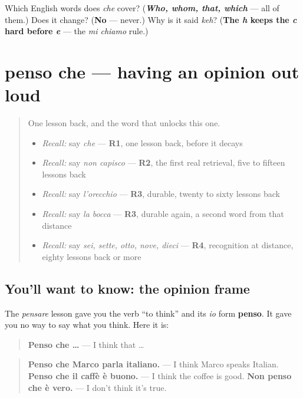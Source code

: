 \begin{tcolorbox}[breakable,colback=teal!4,colframe=teal!35!black,title={Before you move on}]
Which English words does \emph{che} cover? (\emph{\textbf{Who, whom, that, which}} — all of them.) Does it change? (\textbf{No} — never.) Why is it said \emph{keh}? (\textbf{The \emph{h} keeps the \emph{c} hard before \emph{e}} — the \emph{mi chiamo} rule.)
\end{tcolorbox}
\section[penso che]{penso che — having an opinion out loud}

\label{lesson:IT-C31-penso-che}



\begin{quote}
One lesson back, and the word that unlocks this one.

\begin{itemize}
\raggedright
  \item \emph{Recall:} say \emph{che} — \textbf{R1}, one lesson back, before it decays
  \item \emph{Recall:} say \emph{non capisco} — \textbf{R2}, the first real retrieval, five to fifteen lessons back
  \item \emph{Recall:} say \emph{l'orecchio} — \textbf{R3}, durable, twenty to sixty lessons back
  \item \emph{Recall:} say \emph{la bocca} — \textbf{R3}, durable again, a second word from that distance
  \item \emph{Recall:} say \emph{sei, sette, otto, nove, dieci} — \textbf{R4}, recognition at distance, eighty lessons back or more
\end{itemize}
\end{quote}

\subsection*{You'll want to know: the opinion frame}
The \emph{pensare} lesson gave you the verb \textquotedblleft{}to think\textquotedblright{} and its \emph{io} form \textbf{penso}. It gave you no way to say what you think. Here it is:

\begin{quote}
\textbf{Penso che …} — I think that …
\end{quote}

\begin{quote}
\textbf{Penso che Marco parla italiano.} — I think Marco speaks Italian. \textbf{Penso che il caffè è buono.} — I think the coffee is good. \textbf{Non penso che è vero.} — I don't think it's true.
\end{quote}

